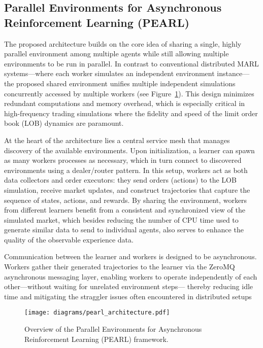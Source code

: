 \documentclass[11pt]{article}
\begin{document}
    \subsection{Parallel Environments for Asynchronous Reinforcement Learning (PEARL)}
    \label{subsec:pearl}
    The proposed architecture builds on the core idea of sharing a single, highly parallel environment among multiple agents while
    still allowing multiple environments to be run in parallel.
    In contrast to conventional distributed MARL systems—where each worker simulates an independent environment instance—
    the proposed shared environment unifies multiple independent simulations concurrently accessed by multiple workers
    (see Figure~\ref{fig:pearl_architecture}).
    This design minimizes redundant computations and memory overhead,
    which is especially critical in high-frequency trading simulations where the fidelity and speed of the limit order book (LOB) dynamics are paramount.

    At the heart of the architecture lies a central service mesh that manages discovery of the available environments.
    Upon initialization, a learner can spawn as many workers processes as necessary,
    which in turn connect to discovered environments using a dealer/router pattern.
    In this setup, workers act as both data collectors and order executors: they send orders (actions) to the LOB simulation,
    receive market updates, and construct trajectories that capture the sequence of states, actions, and rewards.
    By sharing the environment, workers from different learners benefit from a consistent and synchronized view of the simulated market,
    which besides reducing the number of CPU time used to generate similar data to send to individual agents,
    also serves to enhance the quality of the observable experience data.

    Communication between the learner and workers is designed to be asynchronous.
    Workers gather their generated trajectories to the learner via the ZeroMQ asynchronous messaging layer,
    enabling workers to operate independently of each other—without waiting for unrelated environment steps—
    thereby reducing idle time and mitigating the straggler issues often encountered in distributed setups

    \begin{figure}[htb]
        \centering
        \texttt{[image: diagrams/pearl\_architecture.pdf]}
        \caption{Overview of the Parallel Environments for Asynchronous Reinforcement Learning (PEARL) framework.}
        \label{fig:pearl_architecture}
    \end{figure}
\end{document}
